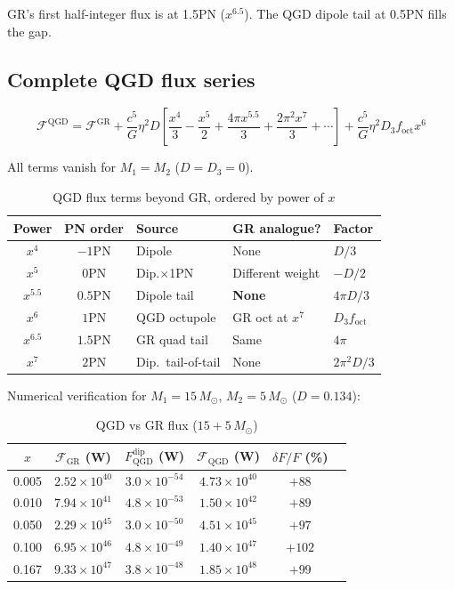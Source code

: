 \documentclass[11pt,a4paper]{article}
\theoremstyle{plain}
\theoremstyle{definition}
\theoremstyle{remark}
\newcommand{\Ms}{M_\odot}
\newcommand{\Fp}{F_{\mathrm{QGD}}^{\mathrm{dip}}}
\begin{document}
GR's first half-integer flux is at 1.5PN ($x^{6.5}$).  The QGD dipole tail at 0.5PN fills the gap.

\subsection{Complete QGD flux series}

\begin{equation}
  \boxed{\mathcal{F}^{\mathrm{QGD}} = \mathcal{F}^{\mathrm{GR}} + \frac{c^5}{G}\eta^2 D\left[\frac{x^4}{3} - \frac{x^5}{2} + \frac{4\pi x^{5.5}}{3} + \frac{2\pi^2 x^7}{3} + \cdots\right] + \frac{c^5}{G}\eta^2 D_3 f_{\mathrm{oct}}x^6}
\end{equation}

All terms vanish for $M_1 = M_2$ ($D = D_3 = 0$).

\begin{table}[h]
  \centering
  \caption{QGD flux terms beyond GR, ordered by power of $x$}
  \begin{tabular}{@{}cclll@{}}
    \toprule
    Power & PN order & Source & GR analogue? & Factor \\
    \midrule
    $x^4$ & $-1$PN & Dipole & None & $D/3$ \\
    $x^5$ & $0$PN & Dip.$\times$1PN & Different weight & $-D/2$ \\
    $x^{5.5}$ & $0.5$PN & Dipole tail & \textbf{None} & $4\pi D/3$ \\
    $x^6$ & $1$PN & QGD octupole & GR oct at $x^7$ & $D_3 f_{\mathrm{oct}}$ \\
    $x^{6.5}$ & $1.5$PN & GR quad tail & Same & $4\pi$ \\
    $x^7$ & $2$PN & Dip.\ tail-of-tail & None & $2\pi^2 D/3$ \\
    \bottomrule
  \end{tabular}
\end{table}

Numerical verification for $M_1 = 15\,\Ms$, $M_2 = 5\,\Ms$ ($D = 0.134$):

\begin{table}[h]
  \centering
  \caption{QGD vs GR flux ($15+5\,\Ms$)}
  \begin{tabular}{@{}cccccc@{}}
    \toprule
    $x$ & $\mathcal{F}_{\mathrm{GR}}$ (W) & $\Fp$ (W) & $\mathcal{F}_{\mathrm{QGD}}$ (W) & $\delta F/F$ (\%) \\
    \midrule
    0.005 & $2.52\times10^{40}$ & $3.0\times10^{-54}$ & $4.73\times10^{40}$ & $+88$ \\
    0.010 & $7.94\times10^{41}$ & $4.8\times10^{-53}$ & $1.50\times10^{42}$ & $+89$ \\
    0.050 & $2.29\times10^{45}$ & $3.0\times10^{-50}$ & $4.51\times10^{45}$ & $+97$ \\
    0.100 & $6.95\times10^{46}$ & $4.8\times10^{-49}$ & $1.40\times10^{47}$ & $+102$ \\
    0.167 & $9.33\times10^{47}$ & $3.8\times10^{-48}$ & $1.85\times10^{48}$ & $+99$ \\
    \bottomrule
  \end{tabular}
\end{table}
\end{document}
